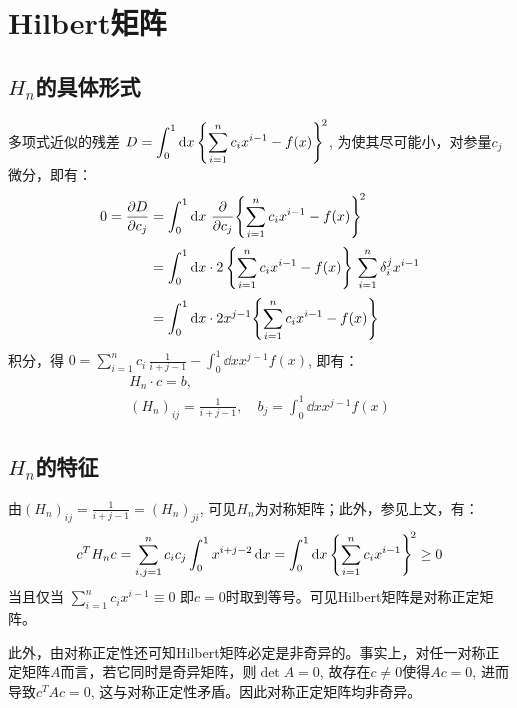 \documentclass[preview,10pt,border=8pt]{standalone}
\begin{document}
\section{Hilbert矩阵}
\subsection{$H_n$的具体形式}
	多项式近似的残差
		$D = \displaystyle\int_0^1 \dd{x}
			\Bqty{
				\sum_{i=1}^n c_i x^{i-1}
				- f(x)}^{\!2}$,
	为使其尽可能小，对参量$c_j$微分，即有：
	\begin{equation}
	\begin{aligned}
		0 = \pdv{D}{c_j}
		&= \displaystyle\int_0^1 \dd{x}\,
			\pdv{c_j}\Bqty{
				\sum_{i=1}^n c_i x^{i-1}
					- f(x)}^{\!2} \\[.5ex]
		&= \displaystyle\int_0^1 \dd{x}\cdot
			2\,\Bqty{
				\sum_{i=1}^n c_i x^{i-1}
					- f(x)}\,
				\sum_{i=1}^n \delta^j_i x^{i-1} \\[.5ex]
		&= \displaystyle\int_0^1 \dd{x}\cdot
			2x^{j-1}\Bqty{
				\sum_{i=1}^n c_i x^{i-1}
					- f(x)}
	\end{aligned}
	\end{equation}
	积分，得
		$0 = \displaystyle\sum_{i=1}^n c_i\,
				\frac{1}{i+j-1}
			- \int_0^1 \dd{x}
				x^{j-1} f(x)$,
	即有：
	\begin{equation}
	\begin{gathered}
		H_n\cdot c = b,\\
		(H_n)_{ij} = \frac{1}{i+j-1},\quad
		b_j = \displaystyle\int_0^1 \dd{x}
			x^{j-1} f(x)
	\end{gathered}
	\end{equation}
\subsection{$H_n$的特征}
	由$(H_n)_{ij} = \frac{1}{i+j-1} = (H_n)_{ji}$, 可见$H_n$为对称矩阵；此外，参见上文，有：
	\begin{equation}
		c^T H_n c = \sum_{i,j=1}^n c_i c_j
			\int_0^1 x^{i+j-2} \dd{x}
		= \int_0^1 \dd{x}
			\Bqty{\sum_{i=1}^n
				c_i x^{i-1}}^{\!2} \ge 0
	\end{equation}
	当且仅当
		$\displaystyle\sum_{i=1}^n
			c_i x^{i-1} \equiv 0$
	即$c = 0$时取到等号。可见Hilbert矩阵是对称正定矩阵。
	
	此外，由对称正定性还可知Hilbert矩阵必定是非奇异的。事实上，对任一对称正定矩阵$A$而言，若它同时是奇异矩阵，则$\det A = 0$, 故存在$c \ne 0$使得$Ac = 0$, 进而导致$c^T A c = 0$, 这与对称正定性矛盾。因此对称正定矩阵均非奇异。
\end{document}
